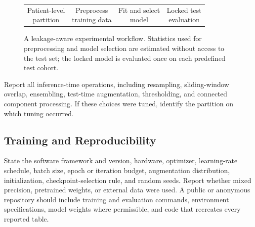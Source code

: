 \begin{figure}
  \centering
  \setlength{\fboxsep}{4pt}
  \begin{tabular}{c@{\quad$\longrightarrow$\quad}c
                  @{\quad$\longrightarrow$\quad}c
                  @{\quad$\longrightarrow$\quad}c}
    \fbox{\parbox[c][1.0cm][c]{0.145\textwidth}{\centering Patient-level\\partition}} &
    \fbox{\parbox[c][1.0cm][c]{0.145\textwidth}{\centering Preprocess\\training data}} &
    \fbox{\parbox[c][1.0cm][c]{0.145\textwidth}{\centering Fit and select\\model}} &
    \fbox{\parbox[c][1.0cm][c]{0.145\textwidth}{\centering Locked test\\evaluation}}
  \end{tabular}
  \caption{A leakage-aware experimental workflow.  Statistics used for
  preprocessing and model selection are estimated without access to the test
  set; the locked model is evaluated once on each predefined test cohort.}
  \label{fig:pipeline}
\end{figure}

Report all inference-time operations, including resampling, sliding-window
overlap, ensembling, test-time augmentation, thresholding, and connected
component processing.  If these choices were tuned, identify the partition on
which tuning occurred.

\subsection{Training and Reproducibility}

State the software framework and version, hardware, optimizer, learning-rate
schedule, batch size, epoch or iteration budget, augmentation distribution,
initialization, checkpoint-selection rule, and random seeds.  Report whether
mixed precision, pretrained weights, or external data were used.  A public or
anonymous repository should include training and evaluation commands,
environment specifications, model weights where permissible, and code that
recreates every reported table.
